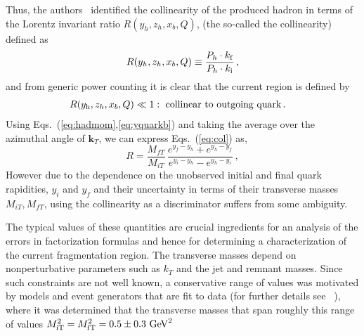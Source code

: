 \documentclass[final,3p,times,onecolumn,sort&compress,hidelinks]{elsarticle}
\newcommand{\xbj}{x_b}
\newcommand{\zh}{z_h}
\newcommand{\Tsc}[2]{#1_{#2\text{T}}}
\newcommand{\initq}{\ensuremath{k_{\rm i}}}
\newcommand{\finalq}{\ensuremath{k_{\rm f}}}
\newcommand{\hady}{\ensuremath{y_{\rm h}}}
\newcommand{\inity}{\ensuremath{y_{\rm i}}}
\newcommand{\finaly}{\ensuremath{y_{\rm f}}}
\newcommand{\ratiocur}{\ensuremath{R}}
\begin{document}
Thus, the authors~\cite{Boglione:2016bph} identified the collinearity of the produced hadron in terms of the Lorentz invariant ratio $R(y_h,z_h,\xbj,Q)$,
(the so-called the collinearity) defined as
\begin{equation}
  R(y_h,z_h,\xbj,Q)\equiv \frac{P_h\cdot \finalq}{P_h\cdot \initq}\, ,
  \label{eq:col}
\end{equation}
and from generic power counting it is clear that the current region is
defined by
\begin{align}
\ratiocur(\hady,\zh,\xbj,Q) \ll 1 &:~ \text{collinear to outgoing quark} \, .
\end{align}
Using Eqs.~(\ref{eq:hadmom},\ref{eq:yquarkb}) and taking the average over the azimuthal angle of
${\bm k}_T$, we can express Eqs.~(\ref{eq:col}) as,
\begin{equation}
R = \frac{M_{fT}} {M_{iT}}\,\frac{e^{y_f-y_h}+e^{y_h-y_f}} {e^{y_i-y_h}-e^{y_h-y_i}}\,,
\label{eq:colrapid}
\end{equation}
However due to the  dependence on the unobserved 
initial and final quark rapidities, $y_i$ and $y_f$ and their uncertainty in terms of their transverse masses  $M_{iT},  M_{fT}$, using the collinearity as a discriminator suffers from some ambiguity.


The typical values of these quantities are crucial ingredients for an
analysis of the errors in factorization formulas and hence for
determining a characterization of the current fragmentation region.
The transverse masses depend on nonperturbative parameters such as
$k_T$ and the jet and remnant masses. Since such constraints are not well known,
a conservative range of values was motivated by models and event generators that are fit to data (for further details see ~\cite{Boglione:2016bph}), 
where it was determined that the  transverse masses that span roughly this range of values
$\Tsc{M}{\rm i}^2 = \Tsc{M}{\rm f}^2 = 0.5 \pm 0.3~{\rm GeV}^2 $
  
\end{document}

